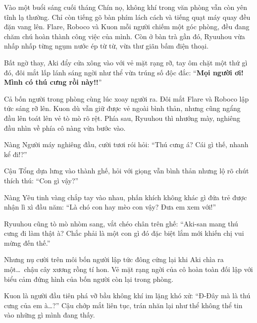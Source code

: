 \documentclass[../main.tex]{subfiles}
\begin{document}

Vào một buổi sáng cuối tháng Chín nọ, không khí trong văn phòng vẫn còn yên tĩnh lạ thường. Chỉ còn tiếng gõ bàn phím lách cách và tiếng quạt máy quay đều đặn vang lên. Flare, Roboco và Kuon mỗi người chiếm một góc phòng, đều đang chăm chú hoàn thành công việc của mình. Còn ở bàn trà gần đó, Ryuuhou vừa nhấp nhấp từng ngụm nước ép từ từ, vừa thư giãn bấm điện thoại.

Bất ngờ thay, Aki đẩy cửa xông vào với vẻ mặt rạng rỡ, tay ôm chặt một thứ gì đó, đôi mắt lấp lánh sáng ngời như thể vừa trúng số độc đắc: ``\textbf{Mọi người ơi! Mình có thú cưng rồi này!!}''

Cả bốn người trong phòng cùng lúc xoay người ra. Đôi mắt Flare và Roboco lập tức sáng rỡ lên. Kuon dù vẫn giữ được vẻ ngoài bình thản, nhưng cũng ngẩng đầu lên toát lên vẻ tò mò rõ rệt. Phía sau, Ryuuhou thì nhướng mày, nghiêng đầu nhìn về phía cô nàng vừa bước vào.

Nàng Người máy nghiêng đầu, cười tươi rói hỏi: ``Thú cưng á? Cái gì thế, nhanh kể đi!?''

Cậu Tổng dựa lưng vào thành ghế, hỏi với giọng vẫn bình thản nhưng lộ rõ chút thích thú: ``Con gì vậy?''

Nàng Yêu tinh vàng chắp tay vào nhau, phấn khích không khác gì đứa trẻ được nhận lì xì đầu năm: ``Là chó con hay mèo con vậy? Đưa em xem với!''

Ryuuhou cũng tò mò nhòm sang, vắt chéo chân trên ghế: ``Aki-san mang thú cưng đi làm thật à? Chắc phải là một con gì đó đặc biệt lắm mới khiến chị vui mừng đến thế.''

Nhưng nụ cười trên môi bốn người lập tức đông cứng lại khi Aki chìa ra một\dots\ chậu cây xương rồng tí hon. Vẻ mặt rạng ngời của cô hoàn toàn đối lập với biểu cảm đứng hình của bốn người còn lại trong phòng.


Kuon là người đầu tiên phá vỡ bầu không khí im lặng khó xử: ``Đ-Đây mà là thú cưng của em à\dots?'' Cậu chớp mắt liên tục, trán nhăn lại như thể không thể tin vào những gì mình đang thấy.
\end{document}
